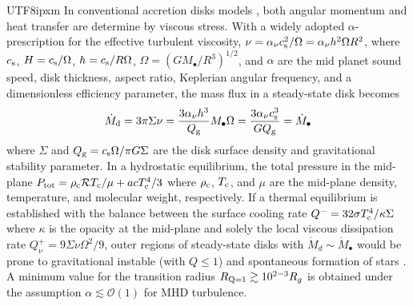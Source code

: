 \documentclass[linenumbers,trackchanges]{aastex701}
\begin{document}
\begin{CJK*}{UTF8}{ipxm}
In conventional accretion disks models \citep{lynden1974},
both angular momentum and heat transfer are determine by
viscous stress.  With a widely adopted $\alpha$-prescription 
\citep{shakura1973} for the effective turbulent viscosity,
$\nu=\alpha_\nu c_{\rm s}^2 /\Omega = \alpha_\nu h^2 \Omega R^2$,
where $c_{\rm s}$, $H=c_{\rm s}/\Omega$, $h= c_{\rm s}/R \Omega$, 
$\Omega=(G M_\bullet / R^3)^{1/2}$, and $\alpha$ are the 
mid planet sound speed, disk thickness, aspect ratio, 
Keplerian angular frequency, and a dimensionless 
efficiency parameter, the mass flux in a steady-state 
disk becomes
\begin{equation}
    {\dot M}_{\rm d} = 3 \pi \Sigma \nu= {3 \alpha_\nu h^3 \over Q_{\rm g}} M_\bullet \Omega = {3 \alpha_\nu c_{\rm s}^3 \over G Q_{\rm g}}
    = {\dot M}_\bullet
    \label{eq:mdotdisk}
\end{equation}
where $\Sigma$ and $Q_{\rm g}=c_{\rm s} \Omega/ \pi G \Sigma$ are
the disk surface density and gravitational stability 
parameter\citep{safronov1960, toomre1964}. In a 
hydrostatic equilibrium, the total pressure in the 
mid-plane $P_{\rm tot}= \rho_{\rm c} {\mathcal R} T_{\rm c} / 
\mu + a c T_{\rm c} ^4 /3$ where $\rho_{\rm c}$, $T_{\rm c}$, 
and $\mu$ are the mid-plane density, temperature, and 
molecular weight, respectively.  If a 
thermal equilibrium is established with the balance between 
the surface cooling rate \citep{hubeny1990} 
$
    Q^- = 32 \sigma T_{\rm c}^4 / \kappa \Sigma
$
where $\kappa$ is the opacity at the 
mid-plane \citep{bell1994} and solely the local viscous 
dissipation rate $Q^+ _\nu = 9 \Sigma \nu \Omega^2/9$, 
outer regions of steady-state  disks with ${\dot M}_d 
\sim {\dot M}_\bullet$ would be prone to gravitational 
instable (with $Q \leq 1$) \citep{paczynski1978}
and spontaneous formation of stars \citep{goodmantan2004}.
A minimum value for the transition radius $R_{\rm Q=1} 
\gtrsim 10^{2-3} R_g$ is obtained under the assumption 
$\alpha \lesssim {\mathcal O} (1)$ for MHD turbulence.


\end{CJK*}
\end{document}
